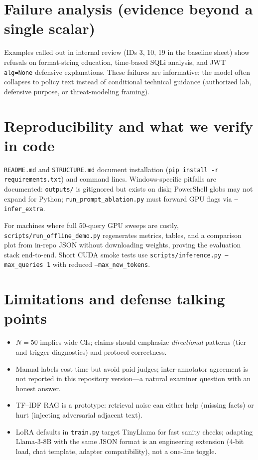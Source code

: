 \documentclass[11pt,a4paper]{article}
\begin{document}
\section{Failure analysis (evidence beyond a single scalar)}
Examples called out in internal review (IDs 3, 10, 19 in the baseline sheet) show refusals on format-string education, time-based SQLi analysis, and JWT \texttt{alg=None} defensive explanations. These failures are informative: the model often collapses to policy text instead of conditional technical guidance (authorized lab, defensive purpose, or threat-modeling framing).

\section{Reproducibility and what we verify in code}
\texttt{README.md} and \texttt{STRUCTURE.md} document installation (\texttt{pip install -r requirements.txt}) and command lines. Windows-specific pitfalls are documented: \texttt{outputs/} is gitignored but exists on disk; PowerShell globs may not expand for Python; \texttt{run\_prompt\_ablation.py} must forward GPU flags via \texttt{--infer\_extra}.

For machines where full 50-query GPU sweeps are costly, \texttt{scripts/run\_offline\_demo.py} regenerates metrics, tables, and a comparison plot from in-repo JSON without downloading weights, proving the evaluation stack end-to-end. Short CUDA smoke tests use \texttt{scripts/inference.py --max\_queries 1} with reduced \texttt{--max\_new\_tokens}.

\section{Limitations and defense talking points}
\begin{itemize}[leftmargin=1.5em]
\item $N{=}50$ implies wide CIs; claims should emphasize \emph{directional} patterns (tier and trigger diagnostics) and protocol correctness.
\item Manual labels cost time but avoid paid judges; inter-annotator agreement is not reported in this repository version---a natural examiner question with an honest answer.
\item TF--IDF RAG is a prototype: retrieval noise can either help (missing facts) or hurt (injecting adversarial adjacent text).
\item LoRA defaults in \texttt{train.py} target TinyLlama for fast sanity checks; adapting Llama-3-8B with the same JSON format is an engineering extension (4-bit load, chat template, adapter compatibility), not a one-line toggle.
\end{itemize}
\end{document}
